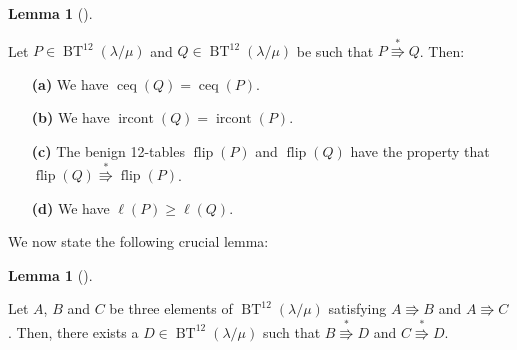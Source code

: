 \documentclass[numbers=enddot,12pt,final,onecolumn,notitlepage]{scrartcl}%
\theoremstyle{definition}
\newtheorem{lem}[theo]{Lemma}
\newenvironment{lemma}[1][]
{\begin{lem}[#1]\begin{leftbar}}
{\end{leftbar}\end{lem}}
\newenvironment{proof}[1][Proof]{\noindent\textbf{#1.} }{\ \rule{0.5em}{0.5em}}
\def\BenignTables{{\operatorname{BT}^{12}\left(  \lambda/\mu\right)}}
\begin{document}
\begin{lemma}
\label{lem.descent-resolution-*props}Let $P\in\BenignTables$ and $Q\in\BenignTables$
be such that $P\overset{\ast}{\Rrightarrow}Q$. Then:

\begin{enumerate}

\item[\textbf{(a)}] We have $\operatorname*{ceq}\left(  Q\right)
=\operatorname*{ceq}\left(  P\right)  $.

\item[\textbf{(b)}] We have $\operatorname*{ircont}\left(  Q\right)
=\operatorname*{ircont}\left(  P\right)  $.

\item[\textbf{(c)}] The benign 12-tables $\operatorname*{flip}\left(  P\right)  $ and
$\operatorname*{flip}\left(  Q\right)  $ have the property that
$\operatorname*{flip}\left(  Q\right)  \overset{\ast}{\Rrightarrow
}\operatorname*{flip}\left(  P\right)  $.

\item[\textbf{(d)}] We have $\ell\left(  P\right)  \geq\ell\left(  Q\right)  $.

\end{enumerate}
\end{lemma}


We now state the following crucial lemma:

\begin{lemma}
\label{prop.descent-resolution-hyps}Let $A$, $B$ and $C$ be three elements of
$\BenignTables$ satisfying $A\Rrightarrow B$ and $A\Rrightarrow C$. Then, there
exists a $D\in\BenignTables$ such that $B\overset{\ast}{\Rrightarrow}D$ and
$C\overset{\ast}{\Rrightarrow}D$.
\end{lemma}
\end{document}
